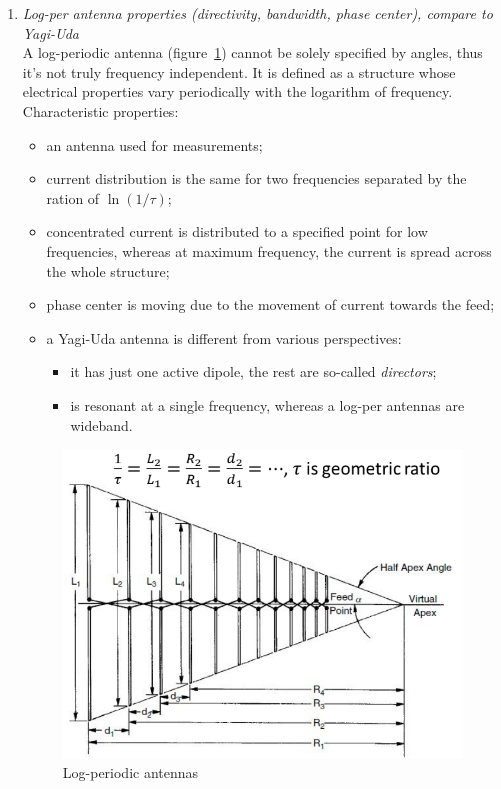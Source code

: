 \documentclass[11pt,a4paper]{article}
\begin{document}
\begin{enumerate}
    \item \emph{Log-per antenna properties (directivity, bandwidth, phase center), compare to Yagi-Uda}\\
    A log-periodic antenna (figure~\ref{fig:log-per-antennas}) cannot be solely specified by angles, thus it's not truly frequency independent. It is defined as a structure whose electrical properties vary periodically with the logarithm of frequency. Characteristic properties:
    \begin{itemize}
        \item an antenna used for measurements;
        \item current distribution is the same for two frequencies separated by the ration of $\ln(1/\tau)$;
        \item concentrated current is distributed to a specified point for low frequencies, whereas at maximum frequency, the current is spread across the whole structure;
        \item phase center is moving due to the movement of current towards the feed;
        \item a Yagi-Uda antenna is different from various perspectives:
        \begin{itemize}
            \item it has just one active dipole, the rest are so-called \emph{directors};
            \item is resonant at a single frequency, whereas a log-per antennas are wideband.
        \end{itemize}
    \end{itemize}
    \begin{figure}[!ht]
        \centering
        \includegraphics[width=.6\textwidth]{src/log-per-antennas.png}
        \caption{\label{fig:log-per-antennas}Log-periodic antennas}
    \end{figure}
    

\end{enumerate}
\end{document}
